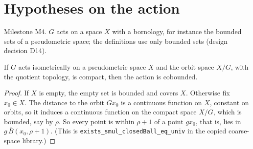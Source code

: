 \chapter{Hypotheses on the action}
\label{chap:actions}

Milestone M4. $G$ acts on a space $X$ with a bornology, for instance the bounded sets of a
pseudometric space; the definitions use only bounded sets (design decision D14).






\begin{lemma}
  \label{isCoboundedSMul_of_compactSpace_quotient}
  If $G$ acts isometrically on a pseudometric space $X$ and the orbit space $X/G$, with the
  quotient topology, is compact, then the action is cobounded.
\end{lemma}
\begin{proof}
  If $X$ is empty, the empty set is bounded and covers $X$. Otherwise fix $x_0 \in X$. The
  distance to the orbit $G x_0$ is a continuous function on $X$, constant on orbits, so it
  induces a continuous function on the compact space $X/G$, which is bounded, say by $\rho$. So
  every point is within $\rho + 1$ of a point $g x_0$, that is, lies in $g\,\bar B(x_0, \rho + 1)$.
  (This is \texttt{exists\_smul\_closedBall\_eq\_univ} in the copied coarse-space library.)
\end{proof}

